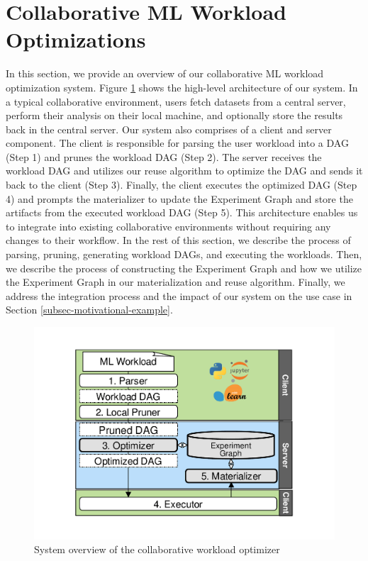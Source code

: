 \section{Collaborative ML Workload Optimizations} \label{sec-ml-workloads}
In this section, we provide an overview of our collaborative ML workload optimization system.
Figure \ref{system-workflow} shows the high-level architecture of our system.
In a typical collaborative environment, users fetch datasets from a central server, perform their analysis on their local machine, and optionally store the results back in the central server.
Our system also comprises of a client and server component.
The client is responsible for parsing the user workload into a DAG (Step 1) and prunes the workload DAG (Step 2).
The server receives the workload DAG and utilizes our reuse algorithm to optimize the DAG and sends it back to the client (Step 3).
Finally, the client executes the optimized DAG (Step 4) and prompts the materializer to update the Experiment Graph and store the artifacts from the executed workload DAG (Step 5).
This architecture enables us to integrate into existing collaborative environments without requiring any changes to their workflow.
In the rest of this section, we describe the process of parsing, pruning, generating workload DAGs, and executing the workloads.
Then, we describe the process of constructing the Experiment Graph and how we utilize the Experiment Graph in our materialization and reuse algorithm. 
Finally, we address the integration process and the impact of our system on the use case in Section \ref{subsec-motivational-example}.

\begin{figure}
\centering
\includegraphics[width=0.8\columnwidth]{../images/system-workflow}
\caption{System overview of the collaborative workload optimizer}
\label{system-workflow}
\end{figure}


